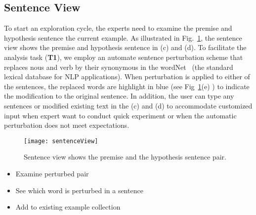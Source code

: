 \subsection{Sentence View}
To start an exploration cycle, the experts need to examine the premise and hypothesis sentence the current example. 
As illustrated in Fig.~\ref{fig:modelPipeline}, the sentence view shows the premise and hypothesis sentence in (c) and (d).
%
To facilitate the analysis task (\textbf{T1}), we employ an automate sentence perturbation scheme that replaces nous and verb by their synonymous in the wordNet~\cite{Miller1995} (the standard lexical database for NLP applications).
%
When perturbation is applied to either of the sentences, the replaced words are highlight in blue (see Fig~\ref{fig:modelPipeline}(e) ) to indicate the modification to the original sentence.
%
In addition, the user can type any sentences or modified existing text in the (c) and (d) to accommodate customized input when expert want to conduct quick experiment or when the automatic perturbation does not meet expectations.

\begin{figure}[htbp]
\centering
\vspace{-2mm}
 \texttt{[image: sentenceView]}
 \caption{Sentence view shows the premise and the hypothesis sentence pair.}
\label{fig:modelPipeline}
\end{figure}

\begin{itemize}
\item Examine perturbed pair
\item See which word is perturbed in a sentence
\item Add to existing example collection
\end{itemize}
